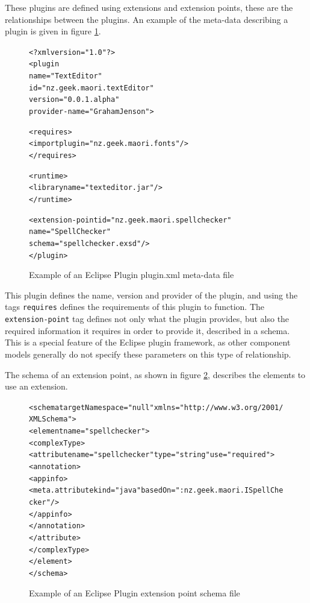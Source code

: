 These plugins are defined using extensions and extension points, these are the relationships between the plugins.
An example of the meta-data describing a plugin is given in figure \ref{eclipseplugin}. 

\begin{figure}[htp]
\begin{center}
\begin{alltt}
<?xml version="1.0"?>
<plugin
    name="Text Editor"
    id="nz.geek.maori.textEditor"
    version="0.0.1.alpha"
    provider-name="Graham Jenson">
    
    <requires>
        <import plugin="nz.geek.maori.fonts"/>
    </requires>

    <runtime>
        <library name="texteditor.jar"/>
    </runtime>
    
    <extension-point id="nz.geek.maori.spellchecker" 
        name="Spell Checker" 
        schema="spellchecker.exsd"/>
</plugin>
\end{alltt}
  \caption[Eclipse Plugin meta-data]{Example of an Eclipse Plugin plugin.xml meta-data file}
  \label{eclipseplugin}
\end{center}
\end{figure}

This plugin defines the name, version and provider of the plugin, and using the tags \verb+requires+ defines the requirements of this plugin to function.
The \verb+extension-point+ tag defines not only what the plugin provides, but also the required information it requires in order to provide it, described in a schema.
This is a special feature of the Eclipse plugin framework, as other component models generally do not specify these parameters on this type of relationship. 

The schema of an extension point, as shown in figure \ref{eclipseextensionschema}, describes the elements to use an extension.

\begin{figure}[htp]
\begin{center}
\begin{alltt}
<schema targetNamespace="null" xmlns="http://www.w3.org/2001/XMLSchema">
 <element name="spellchecker">
  <complexType>
   <attribute name="spellchecker" type="string" use="required">
    <annotation>
     <appinfo>
      <meta.attribute kind="java" basedOn=":nz.geek.maori.ISpellChecker"/>
     </appinfo>
    </annotation>
   </attribute>
  </complexType>
 </element>
</schema>
\end{alltt}
  \caption[Eclipse Plugin extension point schema]{Example of an Eclipse Plugin extension point schema file}
  \label{eclipseextensionschema}
\end{center}
\end{figure}

